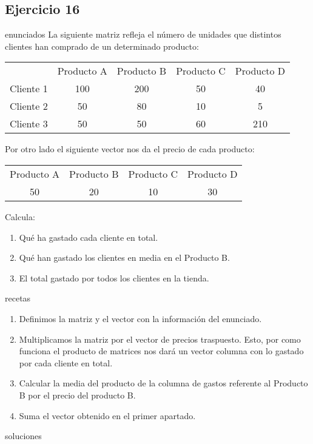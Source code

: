 \subsection{Ejercicio 16}
\def\parte{enunciados}
\ifx\capitulo\parte
La siguiente matriz refleja el número de unidades que distintos clientes han comprado de un determinado producto:\\
\vspace{1em}

\begin{center}
\begin{tabular}[h]{ccccc}
  &Producto A&Producto B&Producto C&Producto D \\
  Cliente 1&100&200&50&40 \\
  Cliente 2&50&80&10&5 \\
  Cliente 3&50&50&60&210
\end{tabular}  
\end{center}



Por otro lado el siguiente vector nos da el precio de cada producto:\\
\vspace{1em}

\begin{center}
\begin{tabular}[h]{cccc}
  Producto A&Producto B&Producto C&Producto D \\
  50&20&10&30
\end{tabular}
  
\end{center}

\vspace{1em}
Calcula:

\begin{enumerate}
\item Qué ha gastado cada cliente en total.
\item Qué han gastado los clientes en media en el Producto B.
\item El total gastado por todos los clientes en la tienda.
\end{enumerate}
\fi

\def\parte{recetas}
\ifx\capitulo\parte
\begin{enumerate}
\item Definimos la matriz y el vector con la información del enunciado.
\item Multiplicamos la matriz por el vector de precios traspuesto. Esto, por como funciona el producto de matrices nos dará un vector columna con lo gastado por cada cliente en total.
\item Calcular la media del producto de la columna de gastos referente al Producto B por el precio del producto B.
\item Suma el vector obtenido en el primer apartado.
\end{enumerate}
\fi

\def\parte{soluciones}
\ifx\capitulo\parte

\fi
